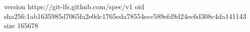 version https://git-lfs.github.com/spec/v1
oid sha256:1ab1635985d7065fa2e0dc1765eda78554ecc589efd9d24ec6d308c4da141143
size 165678

